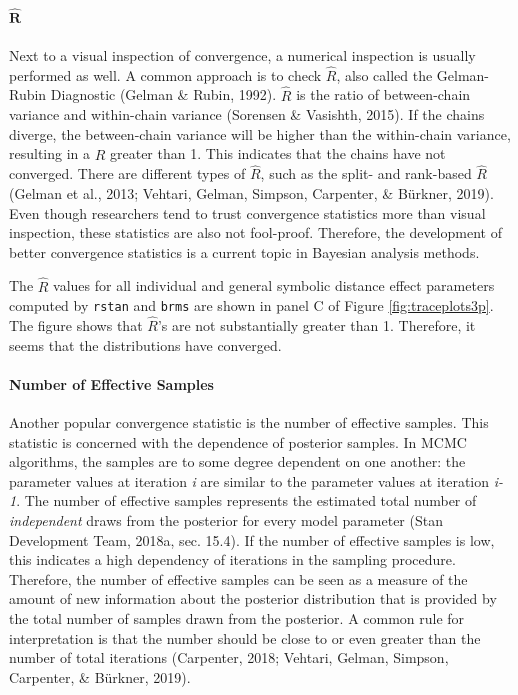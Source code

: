 \documentclass[
  english,
  doc,floatsintext]{apa6}
\let\oldparagraph\paragraph
\renewcommand{\paragraph}[1]{\oldparagraph{#1}\mbox{}}
\begin{document}
\hypertarget{hatbmr}{%
\paragraph{\texorpdfstring{\(\hat{\bm{R}}\)}{\textbackslash hat\{\textbackslash bm\{R\}\}}}\label{hatbmr}}

Next to a visual inspection of convergence, a numerical inspection is usually performed as well. A common approach is to check \(\hat{R}\), also called the Gelman-Rubin Diagnostic (Gelman \& Rubin, 1992). \(\hat{R}\) is the ratio of between-chain variance and within-chain variance (Sorensen \& Vasishth, 2015). If the chains diverge, the between-chain variance will be higher than the within-chain variance, resulting in a \(\hat{R}\) greater than 1. This indicates that the chains have not converged. There are different types of \(\hat{R}\), such as the split- and rank-based \(\hat{R}\) (Gelman et al., 2013; Vehtari, Gelman, Simpson, Carpenter, \& Bürkner, 2019). Even though researchers tend to trust convergence statistics more than visual inspection, these statistics are also not fool-proof. Therefore, the development of better convergence statistics is a current topic in Bayesian analysis methods.

The \(\hat{R}\) values for all individual and general symbolic distance effect parameters computed by \texttt{rstan} and \texttt{brms} are shown in panel C of Figure \ref{fig:traceplots3p}. The figure shows that \(\hat{R}\)'s are not substantially greater than 1. Therefore, it seems that the distributions have converged.

\hypertarget{number-of-effective-samples}{%
\paragraph{Number of Effective Samples}\label{number-of-effective-samples}}

Another popular convergence statistic is the number of effective samples. This statistic is concerned with the dependence of posterior samples. In MCMC algorithms, the samples are to some degree dependent on one another: the parameter values at iteration \emph{i} are similar to the parameter values at iteration \emph{i-1}. The number of effective samples represents the estimated total number of \emph{independent} draws from the posterior for every model parameter (Stan Development Team, 2018a, sec. 15.4). If the number of effective samples is low, this indicates a high dependency of iterations in the sampling procedure. Therefore, the number of effective samples can be seen as a measure of the amount of new information about the posterior distribution that is provided by the total number of samples drawn from the posterior. A common rule for interpretation is that the number should be close to or even greater than the number of total iterations (Carpenter, 2018; Vehtari, Gelman, Simpson, Carpenter, \& Bürkner, 2019).
\end{document}
